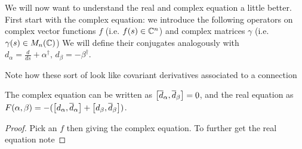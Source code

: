\documentclass{article}
\begin{document}
We will now want to understand the real and complex equation a little better. First start with the complex equation: we introduce the following operators on complex vector functions $f$ (i.e. $f(s) \in \mbb{C}^n$) and complex matrices $\gamma$ (i.e. $\gamma(s) \in M_n(\mbb{C})$) 
We will define their conjugates analogously with $d_\alpha = \frac{d}{ds}+\alpha^\dagger, \, d_\beta =-\beta^\dagger$. 
\begin{remark}
	Note how these sort of look like covariant derivatives associated to a connection
\end{remark}
\begin{lemma}
	The complex equation can be written as $\comm[\bar{d}_\alpha]{\bar{d}_\beta} =0$, and the real equation as $F(\alpha,\beta) = -(\comm[d_\alpha]{\bar{d}_\alpha} + \comm[d_\beta]{\bar{d}_\beta})$. 
\end{lemma}
\begin{proof}
	Pick an $f$ then 
giving the complex equation. To further get the real equation note 
\end{proof}
\end{document}
